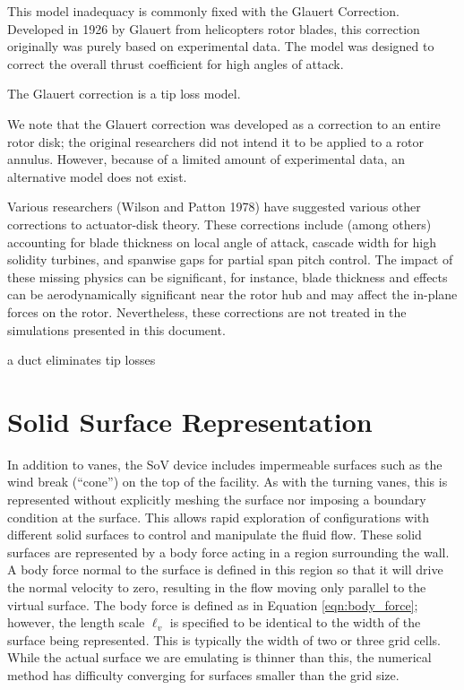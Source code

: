 This model inadequacy is commonly fixed with the Glauert Correction. 
Developed in 1926 by Glauert from helicopters rotor blades, this
correction originally was purely based on experimental data. The model
was designed to correct the overall thrust coefficient for high angles
of attack. 

The Glauert correction is a tip loss model.

We note that the Glauert correction was developed as a correction to an
entire rotor disk; the original researchers did not intend it to be
applied to a rotor annulus. However, because of a limited amount  of
experimental data, an alternative model does not exist.  

Various researchers\cite{?} (Wilson and Patton  1978) have suggested
various other corrections to actuator-disk theory. These corrections
include (among others) accounting for blade thickness on local angle of
attack, cascade width for high solidity turbines, and spanwise gaps for
partial span pitch control. The impact of these missing physics can be
significant, for instance, blade thickness and effects can be  
aerodynamically significant near the rotor hub and may affect the
in-plane forces on the rotor\cite{Moriarty_aerodyntheory}. Nevertheless,
these corrections are not treated in the simulations presented in this
document.  


a duct eliminates tip losses


\section{Solid Surface Representation}
\label{subsec:solid_surface}

In addition to vanes, the SoV device includes impermeable surfaces
such as the wind break (``cone'') on the top of the facility. As with
the turning vanes, this is represented without explicitly meshing the
surface nor imposing  a boundary condition at the surface. This allows
rapid exploration of configurations  with different solid surfaces to
control and manipulate the fluid flow. These solid surfaces are
represented by a body force acting in a region surrounding the wall. 
A body force normal to the surface is defined in this region so
that it will drive the normal velocity to zero, resulting in the flow
moving only parallel to the virtual surface. 
The body force is defined as in Equation
\ref{eqn:body_force}; however, the length scale $\ell_v$ is specified to
be identical to the width of the surface being represented. This is
typically the width of two or three grid cells. While the actual surface we are
emulating is thinner than this, the numerical method has difficulty
converging for surfaces smaller than the grid size.  


